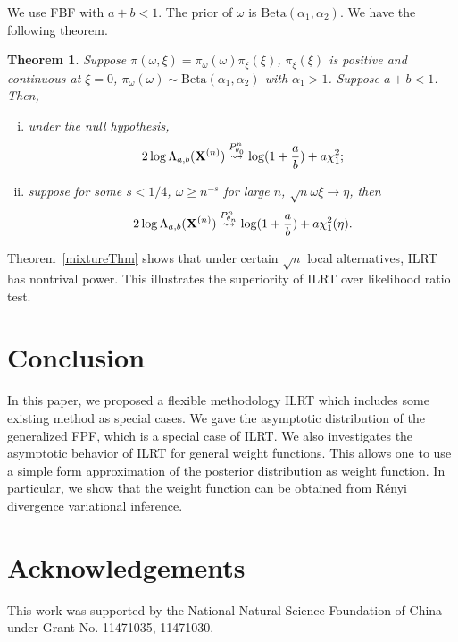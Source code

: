 \documentclass[11pt]{article}
\theoremstyle{plain}
\newtheorem{theorem}{\quad\quad Theorem}
\theoremstyle{definition}
\theoremstyle{remark}
\begin{document}
We use FBF with $a+b<1$. The prior of $\omega$ is $\text{Beta}(\alpha_1,\alpha_2)$.
We have the following theorem.

\begin{theorem}
    Suppose $\pi(\omega,\xi)=\pi_{\omega}(\omega) \pi_{\xi}(\xi)$, $\pi_\xi(\xi)$ is positive and continuous at $\xi=0$,
    $\pi_\omega(\omega)\sim \text{Beta}(\alpha_1,\alpha_2)$ with $\alpha_1>1$.
    Suppose $a+b<1$.
    Then,
    \begin{enumerate}[(i)]
        \item
    under the null hypothesis,
    \begin{equation*}
        2\log \Lambda_{a,b} (\mathbf{X}^{(n)})\overset{P^n_{\theta_0}}{\rightsquigarrow}\log(1+\frac a b)+ a\chi^2_{1};
    \end{equation*}
\item
    suppose for some $s<1/4$, $\omega \geq n^{-s}$ for large $n$, $\sqrt{n}\omega \xi \to \eta$, then
    \begin{equation*}
        2\log \Lambda_{a,b} (\mathbf{X}^{(n)})\overset{P^n_{\theta_n}}{\rightsquigarrow}\log(1+\frac a b)+ a\chi^2_{1}(\eta).
    \end{equation*}
    \label{mixtureThm}
\end{enumerate}
\end{theorem}
Theorem~\ref{mixtureThm} shows that under certain $\sqrt{n}$ local alternatives, ILRT has nontrival power. 
This illustrates the superiority of ILRT over likelihood ratio test.






\section{Conclusion}
In this paper, we proposed a flexible methodology ILRT which includes some existing method as special cases.
We gave the asymptotic distribution of the generalized FPF, which is a special case of ILRT.
We also investigates the asymptotic behavior of ILRT for general weight functions.
This allows one to use a simple form approximation of the posterior distribution as weight function.
In particular, we show that the weight function can be obtained from R\'{e}nyi divergence variational inference.

\section*{Acknowledgements}
This work was supported by the National Natural Science Foundation of China under Grant No. 11471035, 11471030.
\end{document}
